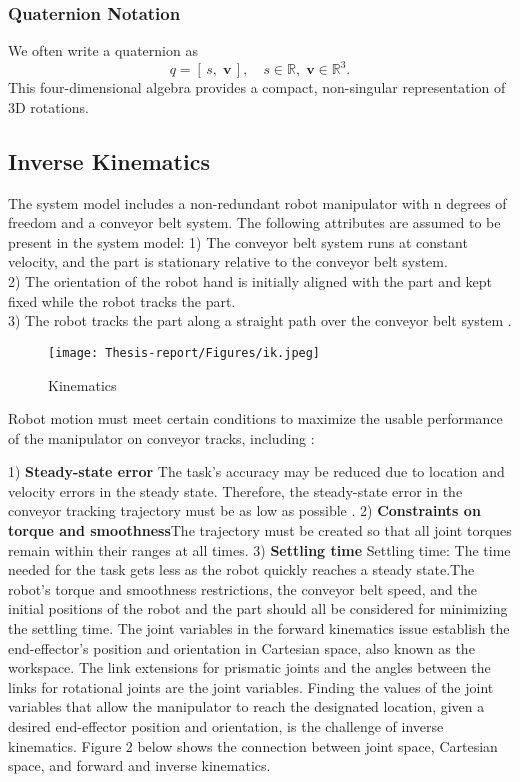 \documentclass[12pt]{article}
\begin{document}
\subsubsection{Quaternion Notation}
We often write a quaternion as
\[
  q = [\,s,\;\mathbf{v}\,],\quad s\in\mathbb{R},\;\mathbf{v}\in\mathbb{R}^3.
\]
This four-dimensional algebra provides a compact, non-singular representation of 3D rotations.

\subsection{Inverse Kinematics}
The system model includes a non-redundant robot manipulator with n degrees of freedom and a conveyor belt system. The following attributes are assumed to be present in the system model: \cite{ref14}
1) The conveyor belt system runs at constant velocity, and the
part is stationary relative to the conveyor belt system\cite{ref14}.\\
2) The orientation of the robot hand is initially aligned with the part and kept fixed while the robot tracks the part\cite{ref14}.\\
3) The robot tracks the part along a straight path over the
conveyor belt system \cite{ref14}.

\begin{figure}[h]
    \centering
    \texttt{[image: Thesis-report/Figures/ik.jpeg]}  
    \caption{Kinematics \cite{ref14}}
    \label{fig:Photoneo Cmaera}
\end{figure}

Robot motion must meet certain conditions to maximize the usable performance of the manipulator on conveyor tracks, including \cite{ref14}:

1) \textbf{Steady-state error}  The task's accuracy may be reduced due to location and velocity errors in the steady state. Therefore, the steady-state error in the conveyor tracking trajectory must be as low as possible \cite{ref14}.
2)  \textbf{Constraints on torque and smoothness}The trajectory must be created so that all joint torques remain within their ranges at all times\cite{ref14}.
3) \textbf{Settling time}  Settling time: The time needed for the task gets less as the robot quickly reaches a steady state.The robot's torque and smoothness restrictions, the conveyor belt speed, and the initial positions of the robot and the part should all be considered for minimizing the settling time\cite{ref14}.
The joint variables in the forward kinematics issue establish the end-effector's position and orientation in Cartesian space, also known as the workspace. The link extensions for prismatic joints and the angles between the links for rotational joints are the joint variables. Finding the values of the joint variables that allow the manipulator to reach the designated location, given a desired end-effector position and orientation, is the challenge of inverse kinematics.  Figure 2 below shows the connection between joint space, Cartesian space, and forward and inverse kinematics\cite{ref10}.\\
\end{document}
